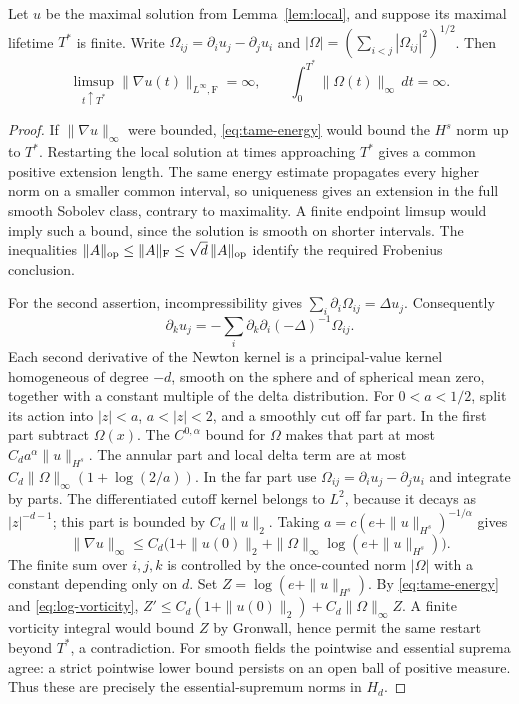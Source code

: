 \begin{lemma}\label{lem:continuation}
Let $u$ be the maximal solution from Lemma~\ref{lem:local}, and suppose
its maximal lifetime $T^*$ is finite. Write
$\Omega_{ij}=\partial_i u_j-\partial_j u_i$ and
$|\Omega|=(\sum_{i<j}|\Omega_{ij}|^2)^{1/2}$. Then
\[
 \limsup_{t\uparrow T^*}\|\nabla u(t)\|_{L^\infty,\mathrm F}=\infty,
 \qquad \int_0^{T^*}\|\Omega(t)\|_\infty\,dt=\infty.
\]
\end{lemma}
\begin{proof}
If $\|\nabla u\|_\infty$ were bounded, \eqref{eq:tame-energy} would
bound the $H^s$ norm up to $T^*$. Restarting the local solution at times
approaching $T^*$ gives a common positive extension length.
The same energy estimate propagates every higher norm on a smaller
common interval, so uniqueness gives an extension in the full smooth
Sobolev class, contrary to maximality. A finite endpoint limsup would
imply such a bound, since the solution is smooth on shorter intervals.
The inequalities $\|A\|_{\rm op}\leq\|A\|_{\rm F}\leq
\sqrt d\,\|A\|_{\rm op}$ identify the required Frobenius conclusion.

For the second assertion, incompressibility gives
$\sum_i\partial_i\Omega_{ij}=\Delta u_j$. Consequently
\[
 \partial_k u_j=-\sum_i\partial_k\partial_i(-\Delta)^{-1}\Omega_{ij}.
\]
Each second derivative of the Newton kernel is a principal-value kernel
homogeneous of degree $-d$, smooth on the sphere and of spherical mean
zero, together with a constant multiple of the delta distribution.
For $0<a<1/2$, split its action into $|z|<a$, $a<|z|<2$, and a
smoothly cut off far part. In the first part subtract $\Omega(x)$.
The $C^{0,\alpha}$ bound for $\Omega$ makes that part at most
$C_da^\alpha\|u\|_{H^s}$. The annular part and local delta term are at
most $C_d\|\Omega\|_\infty(1+\log(2/a))$. In the far part use
$\Omega_{ij}=\partial_i u_j-\partial_j u_i$ and integrate by parts.
The differentiated cutoff kernel belongs to $L^2$, because it decays
as $|z|^{-d-1}$; this part is bounded by $C_d\|u\|_2$.
Taking $a=c(e+\|u\|_{H^s})^{-1/\alpha}$ gives
\begin{equation}\label{eq:log-vorticity}
 \|\nabla u\|_\infty\leq
 C_d\bigl(1+\|u(0)\|_2+
       \|\Omega\|_\infty\log(e+\|u\|_{H^s})\bigr).
\end{equation}
The finite sum over $i,j,k$ is controlled by the once-counted norm
$|\Omega|$ with a constant depending only on $d$.
Set $Z=\log(e+\|u\|_{H^s})$. By \eqref{eq:tame-energy} and
\eqref{eq:log-vorticity},
$Z'\leq C_d(1+\|u(0)\|_2)+C_d\|\Omega\|_\infty Z$.
A finite vorticity integral would bound $Z$ by Gronwall, hence permit
the same restart beyond $T^*$, a contradiction.
For smooth fields the pointwise and essential suprema agree: a strict
pointwise lower bound persists on an open ball of positive measure.
Thus these are precisely the essential-supremum norms in $H_d$.
\end{proof}

